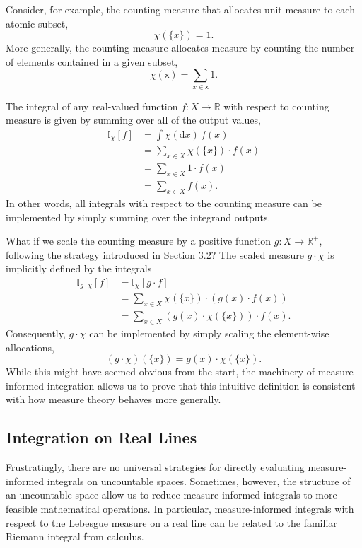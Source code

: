 \documentclass[
  letterpaper,
  DIV=11,
  numbers=noendperiod]{scrartcl}
\begin{document}
Consider, for example, the counting measure that allocates unit measure
to each atomic subset, \[
\chi( \{x \}) = 1.
\] More generally, the counting measure allocates measure by counting
the number of elements contained in a given subset, \[
\chi( \mathsf{x} ) = \sum_{x \in \mathsf{x}} 1.
\]

The integral of any real-valued function \(f: X \rightarrow \mathbb{R}\)
with respect to counting measure is given by summing over all of the
output values, \begin{align*}
\mathbb{I}_{\chi}[f]
&=
\int \chi( \mathrm{d} x) \, f(x)
\\
&=
\sum_{x \in X} \chi(\{ x \}) \cdot f(x)
\\
&=
\sum_{x \in X} 1 \cdot f(x)
\\
&=
\sum_{x \in X} f(x).
\end{align*} In other words, all integrals with respect to the counting
measure can be implemented by simply summing over the integrand outputs.

What if we scale the counting measure by a positive function
\(g : X \rightarrow \mathbb{R}^{+}\), following the strategy introduced
in \hyperref[sec:scaling_measures]{Section 3.2}? The scaled measure
\(g \cdot \chi\) is implicitly defined by the integrals \begin{align*}
\mathbb{I}_{g \cdot \chi}[f]
&=
\mathbb{I}_{\chi}[g \cdot f]
\\
&=
\sum_{x \in X}
\chi( \{ x \}) \cdot \left( g(x) \cdot f(x) \right)
\\
&=
\sum_{x \in X}
\left( g(x) \cdot \chi( \{ x \} ) \right) \cdot f(x).
\end{align*} Consequently, \(g \cdot \chi\) can be implemented by simply
scaling the element-wise allocations, \[
(g \cdot \chi)( \{ x \} ) = g(x) \cdot \chi( \{ x \} ).
\] While this might have seemed obvious from the start, the machinery of
measure-informed integration allows us to prove that this intuitive
definition is consistent with how measure theory behaves more generally.

\subsection{Integration on Real Lines}\label{sec:integration_on_R}

Frustratingly, there are no universal strategies for directly evaluating
measure-informed integrals on uncountable spaces. Sometimes, however,
the structure of an uncountable space allow us to reduce
measure-informed integrals to more feasible mathematical operations. In
particular, measure-informed integrals with respect to the Lebesgue
measure on a real line can be related to the familiar Riemann integral
from calculus.
\end{document}
